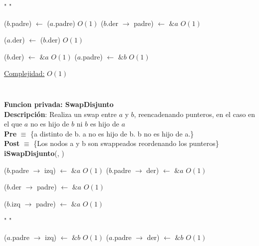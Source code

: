 \begin{Algoritmos}
\begin{algorithm}[H]
\begin{algorithmic}[1]
    \State " "

    \State ($b$.padre) $\gets$ ($a$.padre) \Comment $O(1)$
        \State ($b$.der $\to$ padre) $\gets$ $\&a$ \Comment $O(1)$
    \EndIf
    
    \State ($a$.der) $\gets$ ($b$.der) \Comment $O(1)$
    
    \State ($b$.der) $\gets$ $\&a$ \Comment $O(1)$
    \State ($a$.padre) $\gets$ $\&b$ \Comment $O(1)$

    \medskip
    \Statex \underline{Complejidad:} $O(1)$

\end{algorithmic}
\end{algorithm}

$ $\newline


$ $\newline

\begin{algorithm}[H]
\textbf{Funcion privada: SwapDisjunto}\\
\textbf{Descripci\'on}: Realiza un swap entre $a$ y $b$, reencadenando punteros, en el caso en el que $a$ no es hijo de $b$ ni $b$ es hijo de $a$\\
\textbf{Pre} $\equiv$ \{a distinto de b. a no es hijo de b. b no es hijo de a.\}\\
\textbf{Post} $\equiv$ \{Los nodos a y b son swappeados reordenando los punteros\}\\
{\textbf{iSwapDisjunto}(, )}
\begin{algorithmic}[1]

        \State ($b$.padre $\to$ izq) $\gets$ $\&a$ \Comment $O(1)$
    \Else {}
        \State ($b$.padre $\to$ der) $\gets$ $\&a$ \Comment $O(1)$
    \EndIf
    \EndIf

        \State ($b$.der $\to$ padre) $\gets$ $\&a$ \Comment $O(1)$
    \EndIf

        \State ($b$.izq $\to$ padre) $\gets$ $\&a$ \Comment $O(1)$
    \EndIf

    \State " "

        \State ($a$.padre $\to$ izq) $\gets$ $\&b$ \Comment $O(1)$
    \Else {}
        \State ($a$.padre $\to$ der) $\gets$ $\&b$ \Comment $O(1)$
    \EndIf
    \EndIf


\end{algorithmic}
\end{algorithm}
\end{Algoritmos}
